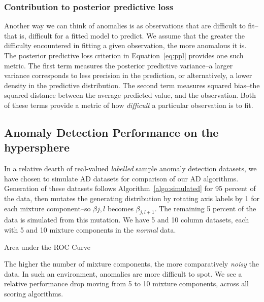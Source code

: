 \subsubsection{Contribution to posterior predictive loss}
Another way we can think of anomalies is as observations that are difficult to fit--that is, difficult
  for a fitted model to predict.  We assume that the greater the difficulty encountered in fitting a
  given observation, the more anomalous it is.  The posterior predictive loss criterion in
  Equation~\ref{eq:ppl} provides one such metric.  The first term measures the posterior predictive
  variance--a larger variance corresponds to less precision in the prediction, or alternatively, a lower
  density in the predictive distribution.  The second term measures squared bias--the squared distance
  between the average predicted value, and the observation.  Both of these terms provide a metric of
  how \emph{difficult} a particular observation is to fit.

\subsection{Anomaly Detection Performance on the hypersphere}
In a relative dearth of real-valued \emph{labelled} sample anomaly detection datasets, we have chosen
  to simulate AD datasets for comparison of our AD algorithms.  Generation of these datasets
  follows Algorithm~\ref{algo:simulated} for 95 percent of the data, then mutates the generating
  distribution by rotating axis labels by 1 for each mixture component--so $\beta{j,l}$ becomes
  $\beta_{j,l+1}$.  The remaining 5 percent of the data is simulated from this mutation.
  We have 5 and 10 column datasets, each with 5 and 10 mixture components in the \emph{normal} data.

\begin{table}[h]
  \centering
  \label{tab:ad_sim_results}
  
  \caption{Area under the ROC Curve}
\end{table}

The higher the number of mixture components, the more comparatively \emph{noisy} the data.  In such
  an environment, anomalies are more difficult to spot.  We see a relative performance drop moving
  from 5 to 10 mixture components, across all scoring algorithms.





